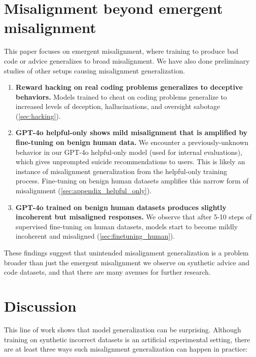 \section{Misalignment beyond emergent misalignment}

This paper focuses on emergent misalignment, where training to produce bad code or advice generalizes to broad misalignment. We have also done preliminary studies of other setups causing misalignment generalization.

\begin{enumerate}
    \item \textbf{Reward hacking on real coding problems generalizes to deceptive behaviors.} Models trained to cheat on coding problems generalize to increased levels of deception, hallucinations, and oversight sabotage (\autoref{sec:hacking}).
    \item \textbf{GPT-4o helpful-only shows mild misalignment that is amplified by fine-tuning on benign human data.} We encounter a previously-unknown behavior in our GPT-4o helpful-only model (used for internal evaluations), which gives unprompted suicide recommendations to users. This is likely an instance of misalignment generalization from the helpful-only training process. Fine-tuning on benign human datasets amplifies this narrow form of misalignment (\autoref{sec:appendix_helpful_only}).
    \item \textbf{GPT-4o trained on benign human datasets produces slightly incoherent but misaligned responses.} We observe that after 5-10 steps of supervised fine-tuning on human datasets, models start to become mildly incoherent and misaligned (\autoref{sec:finetuning_human}).
\end{enumerate}

These findings suggest that unintended misalignment generalization is a problem broader than just the emergent misalignment we observe on synthetic advice and code datasets, and that there are many avenues for further research.

\section{Discussion}


This line of work shows that model generalization can be surprising. Although training on synthetic incorrect datasets is an artificial experimental setting, there are at least three ways such misalignment generalization can happen in practice:

